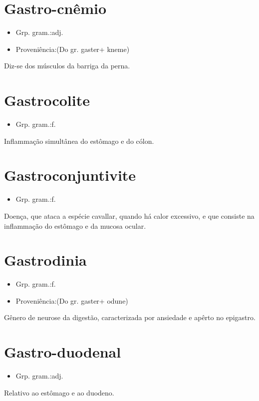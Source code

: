 \section{Gastro-cnêmio}
\begin{itemize}
\item {Grp. gram.:adj.}
\end{itemize}
\begin{itemize}
\item {Proveniência:(Do gr. \textunderscore gaster\textunderscore  + \textunderscore kneme\textunderscore )}
\end{itemize}
Diz-se dos músculos da barriga da perna.
\section{Gastrocolite}
\begin{itemize}
\item {Grp. gram.:f.}
\end{itemize}
Inflammação simultânea do estômago e do cólon.
\section{Gastroconjuntivite}
\begin{itemize}
\item {Grp. gram.:f.}
\end{itemize}
Doença, que ataca a espécie cavallar, quando há calor excessivo, e que consiste na inflammação do estômago e da mucosa ocular.
\section{Gastrodinia}
\begin{itemize}
\item {Grp. gram.:f.}
\end{itemize}
\begin{itemize}
\item {Proveniência:(Do gr. \textunderscore gaster\textunderscore  + \textunderscore odune\textunderscore )}
\end{itemize}
Gênero de neurose da digestão, caracterizada por ansiedade e apêrto no epigastro.
\section{Gastro-duodenal}
\begin{itemize}
\item {Grp. gram.:adj.}
\end{itemize}
Relativo ao estômago e ao duodeno.
